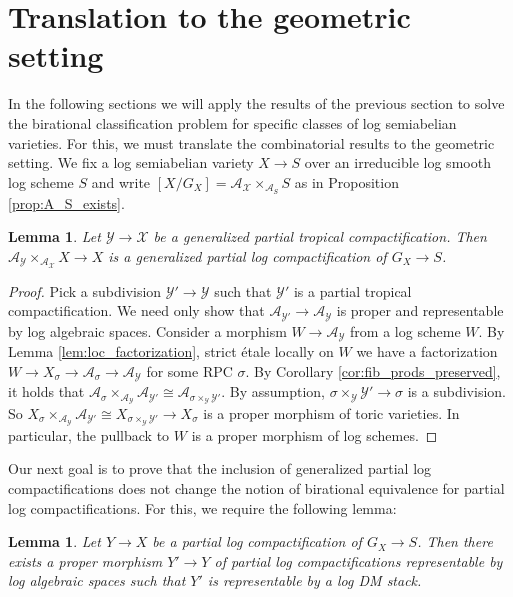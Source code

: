 \documentclass[11pt]{amsart}
\newtheorem{lemma}[theorem]{Lemma}
\theoremstyle{definition}
\theoremstyle{remark}
\begin{document}
\section{Translation to the geometric setting}
\label{sec:translate_geom}

In the following sections we will apply the results of the previous section
to solve the birational classification problem for specific classes
of log semiabelian varieties. For this, we must translate the combinatorial results to
the geometric setting. We fix a log semiabelian variety $X\to S$ over an irreducible log smooth
log scheme $S$ and write
$[X/G_X]=\mathcal{A}_{\mathcal{X}}\times_{\mathcal{A}_{S}}S$ as in Proposition \ref{prop:A_S_exists}.

\begin{lemma}
	Let $\mathcal{Y}\to \mathcal{X}$ be a generalized partial tropical compactification. Then $\mathcal{A}_{\mathcal{Y}}\times_{\mathcal{A}_{\mathcal{X}}}X\to X$
	is a generalized partial log compactification of $G_X\to S$.
\end{lemma}

\begin{proof}
	Pick a subdivision $\mathcal{Y}'\to \mathcal{Y}$ such that $\mathcal{Y}'$ is a partial tropical compactification.
	We need only show that $\mathcal{A}_{\mathcal{Y}'}\to \mathcal{A}_{\mathcal{Y}}$ is proper and representable by
	log algebraic spaces. Consider a morphism $W\to \mathcal{A}_{\mathcal{Y}}$ from
	a log scheme $W$. By Lemma \ref{lem:loc_factorization}, strict étale locally on $W$ we have a
	factorization $W\to X_{\sigma}\to \mathcal{A}_{\sigma}\to \mathcal{A}_{\mathcal{Y}}$
	for some RPC $\sigma$. By Corollary \ref{cor:fib_prods_preserved},
	it holds that $\mathcal{A}_{\sigma}\times_{\mathcal{A}_{\mathcal{Y}}}\mathcal{A}_{\mathcal{Y}'}\cong \mathcal{A}_{\sigma\times_{\mathcal{Y}}\mathcal{Y}'}$.
	By assumption, $\sigma\times_{\mathcal{Y}}\mathcal{Y}'\to \sigma$ is a subdivision. So $X_{\sigma}\times_{\mathcal{A}_{\mathcal{Y}}}\mathcal{A}_{\mathcal{Y}'}\cong X_{\sigma\times_{\mathcal{Y}}\mathcal{Y}'}\to X_{\sigma}$
	is a proper morphism of toric varieties. In particular, the pullback to $W$ is a proper morphism of log schemes.
\end{proof}

Our next goal is to prove that the inclusion of generalized partial log compactifications does not change the notion
of birational equivalence for partial log compactifications. For this, we require the following lemma:

\begin{lemma}
	\label{lem:always_bir_to_DM}
	Let $Y\to X$ be a
	partial log compactification of $G_X\to S$. Then there exists
	a proper morphism $Y'\to Y$ of partial log
	compactifications representable by log algebraic spaces
	such that $Y'$ is representable by a log DM stack.
\end{lemma}
\end{document}
